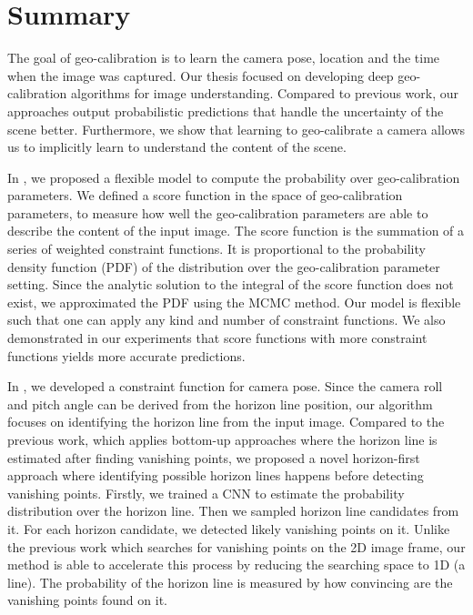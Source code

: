 \chapter{Summary}
\label{chap:discussion}

The goal of geo-calibration is to learn the camera pose, location and
the time when the image was captured.
Our thesis focused on developing deep geo-calibration algorithms for
image understanding.
Compared to previous work, our approaches output probabilistic
predictions that handle the uncertainty of the scene
better. Furthermore, we show that
learning to geo-calibrate a camera allows us to implicitly learn to
understand the content of the scene.


In , we proposed a flexible model to compute the
probability over geo-calibration parameters. We defined a score
function in the space of geo-calibration parameters, to measure how
well the geo-calibration parameters are able to describe the content
of the input image.
The score function is the summation of a series of weighted
constraint functions. It is proportional to the probability density
function (PDF) of the distribution over the geo-calibration parameter setting.
Since the analytic solution to the
integral of the score function does not exist, we approximated the
PDF using the MCMC method. Our model is flexible such that one can apply
any kind and number of constraint functions.
We also demonstrated in our experiments that score functions with more
constraint functions yields more accurate predictions.

In , we developed a constraint function for
camera pose. Since the camera roll and pitch angle can be derived from
the horizon line position, our algorithm focuses on identifying the
horizon line from the input image.
Compared to the previous work, which applies bottom-up
approaches where the horizon line is estimated after finding vanishing
points, we proposed a novel horizon-first approach where
identifying possible horizon lines happens before detecting vanishing
points. 
Firstly, we trained a CNN to estimate the probability distribution
over the horizon line. Then we sampled horizon line candidates from
it. For each horizon candidate, we detected likely
vanishing points on it. Unlike the previous work which searches for
vanishing points on the 2D image frame, our method is able to
accelerate this process by reducing the searching space to
1D (a line). The probability of the horizon line is measured by how
convincing are the vanishing points found on it. 


